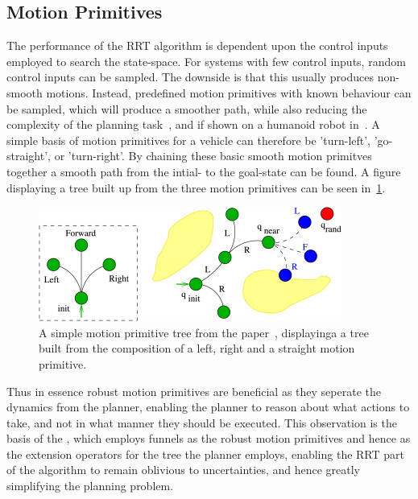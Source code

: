 \subsection{Motion Primitives}

The performance of the \ac{RRT} algorithm is dependent upon the control inputs
employed to search the state-space. For systems with few control inputs, random
control inputs can be sampled. The downside is that this usually produces
non-smooth motions. Instead, predefined motion primitives with known behaviour
can be sampled, which will produce a smoother path, while also reducing the
complexity of the planning task~\cite{vonasekGlobalMotionPlanning2013}, and if
shown on a humanoid robot in~\cite{hauserUsingMotionPrimitives2008}. A simple
basis of motion primitives for a vehicle can therefore be 'turn-left',
'go-straight', or 'turn-right'. By chaining these basic smooth motion primitves
together a smooth path from the intial- to the goal-state can be found. A figure
displaying a tree built up from the three motion primitives can be seen
in~\cref{fig:motion-primitive-tree}.

\begin{figure}
  \centering
  \includegraphics[scale=1]{figures/preliminaries/motion-primitive-tree}
  \caption{A simple motion primitive tree from the
    paper~\cite{vonasekHighlevelMotionPlanning2015}, displayinga a tree built
    from the composition of a left, right and a straight motion primitive.}
  \label{fig:motion-primitive-tree}
\end{figure}

Thus in essence robust motion primitives are beneficial as they seperate the
dynamics from the planner, enabling the planner to reason about what actions to
take, and not in what manner they should be executed. This observation is the
basis of the \rrtfunnel{}, which employs funnels as the robust motion primitives
and hence as the extension operators for the tree the planner employs, enabling
the \ac{RRT} part of the \rrtfunnel{} algorithm to remain oblivious to
uncertainties, and hence greatly simplifying the planning problem.

